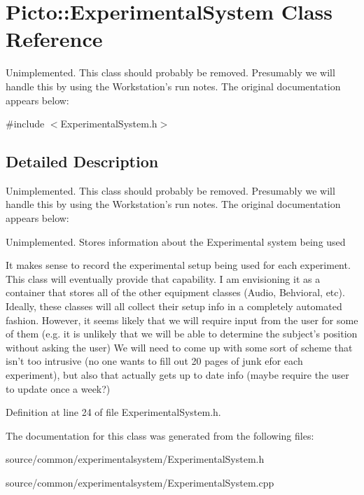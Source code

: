 \hypertarget{class_picto_1_1_experimental_system}{\section{Picto\-:\-:Experimental\-System Class Reference}
\label{class_picto_1_1_experimental_system}
}


Unimplemented. This class should probably be removed. Presumably we will handle this by using the Workstation's run notes. The original documentation appears below\-:  




{\ttfamily \#include $<$Experimental\-System.\-h$>$}



\subsection{Detailed Description}
Unimplemented. This class should probably be removed. Presumably we will handle this by using the Workstation's run notes. The original documentation appears below\-: 

Unimplemented. Stores information about the Experimental system being used

It makes sense to record the experimental setup being used for each experiment. This class will eventually provide that capability. I am envisioning it as a container that stores all of the other equipment classes (Audio, Behvioral, etc). Ideally, these classes will all collect their setup info in a completely automated fashion. However, it seems likely that we will require input from the user for some of them (e.\-g. it is unlikely that we will be able to determine the subject's position without asking the user) We will need to come up with some sort of scheme that isn't too intrusive (no one wants to fill out 20 pages of junk efor each experiment), but also that actually gets up to date info (maybe require the user to update once a week?) 

Definition at line 24 of file Experimental\-System.\-h.



The documentation for this class was generated from the following files\-:\begin{DoxyCompactItemize}
\item 
source/common/experimentalsystem/Experimental\-System.\-h\item 
source/common/experimentalsystem/Experimental\-System.\-cpp\end{DoxyCompactItemize}
